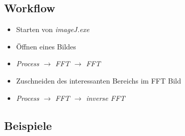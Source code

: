 \documentclass[12pt,german]{article}
\begin{document}
\subsection{Workflow}
\begin{itemize}
	\item Starten von \textit{imageJ.exe}
	\item Öffnen eines Bildes
	\item \textit{Process $\rightarrow$ FFT $\rightarrow$ FFT}
	\item Zuschneiden des interessanten Bereichs im FFT Bild
	\item \textit{Process $\rightarrow$ FFT $\rightarrow$ inverse FFT}
\end{itemize}

\subsection{Beispiele}
\end{document}
